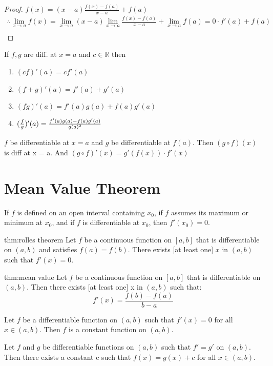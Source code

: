 \documentclass{notes}
\begin{document}
\begin{proof}
	$f(x) = (x - a) \frac{f(x)-f(a)}{x-a} + f(a)$
	\begin{align}
	\therefore \lim_{x \to a}f(x) = \lim_{x \to a}(x - a) \lim_{x \to a}\frac{f(x)-f(a)}{x-a} + \lim_{x \to a}f(a) = 0\cdot f'(a) + f(a)\\
	\end{align}
\end{proof}

\begin{theorem}[Properties]{} 
	If $f, g$ are diff. at $x = a$ and $c \in \mathbb{R}$ then
	\begin{enumerate}
		\item 
		$(cf)'(a) = cf'(a)$
		\item 
		$(f+g)'(a) = f'(a)+g'(a)$
		\item 
		$(fg)'(a) = f'(a)g(a)+f(a)g'(a)$
		\item 
		$({f \over g})'(a) = \frac{f'(a)g(a) - f(a)g'(a)}{g(a)^2}$
	\end{enumerate} 
\end{theorem}


\begin{theorem}{}
	$f $ be differentiable at $x = a$ and $g$ be differentiable at $f(a)$. Then $(g \circ f )(x)$ is diff at x = a. And  $(g \circ f )'(x) = g'(f(x)) \cdot f'(x)$
\end{theorem}

\section{Mean Value Theorem}

\begin{theorem}{}
If $f$ is defined on an open interval containing $x_0$, if $f$ assumes its
maximum or minimum at $x_0$, and if $f$ is differentiable at $x_0$, then
$f '(x_0) = 0$.
\end{theorem}
\begin{theorem}{thm:rolles theorem}
	Let $f$ be a continuous function on $[a, b]$ that is differentiable on $(a, b)$
	and satisfies $f(a) = f(b)$. There exists [at least one] $x$ in $(a, b)$ such
	that $f '(x) = 0$.
\end{theorem}
\begin{theorem}{thm:mean value}
Let $f$ be a continuous function on $[a, b]$ that is differentiable on $(a, b)$.
Then there exists [at least one] x in $(a, b)$ such that:
$$ f'(x) = \frac{f(b) - f(a)}{b - a }$$
\end{theorem}
\begin{corollary}{}
Let $f$ be a differentiable function on $(a, b)$ such that $f '(x) = 0$ for all
$x \in(a, b)$. Then $f$ is a constant function on $(a, b)$.
\end{corollary}
\begin{corollary}{}
Let $f$ and $g$ be differentiable functions on $(a, b)$ such that $f ' = g'$ on
$(a, b)$. Then there exists a constant c such that $f(x) = g(x) + c$ for
all $x \in(a, b)$.
\end{corollary}
\end{document}
